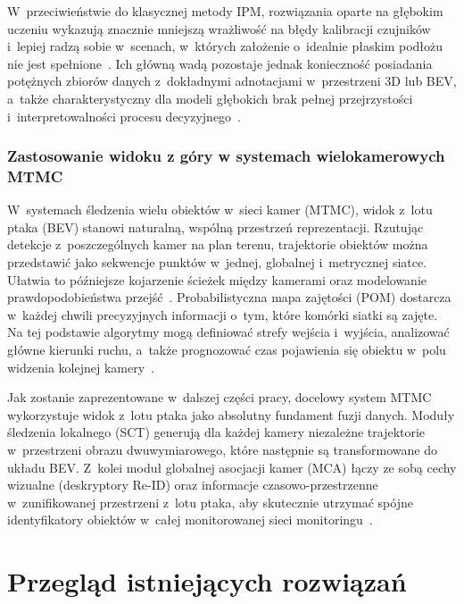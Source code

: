 W~przeciwieństwie do klasycznej metody IPM, rozwiązania oparte na głębokim uczeniu wykazują
znacznie mniejszą wrażliwość na błędy kalibracji czujników i~lepiej radzą sobie w~scenach,
w~których założenie o~idealnie płaskim podłożu nie jest spełnione~\cite{li2023}. Ich główną wadą
pozostaje jednak konieczność posiadania potężnych zbiorów danych z~dokładnymi adnotacjami
w~przestrzeni 3D lub BEV, a~także charakterystyczny dla modeli głębokich brak pełnej przejrzystości
i~interpretowalności procesu decyzyjnego~\cite{li2023, zhao2024}.

\subsection{Zastosowanie widoku z góry w systemach wielokamerowych MTMC}

W~systemach śledzenia wielu obiektów w~sieci kamer (MTMC), widok z~lotu ptaka (BEV) stanowi
naturalną, wspólną przestrzeń reprezentacji. Rzutując detekcje z~poszczególnych kamer na plan
terenu, trajektorie obiektów można przedstawić jako sekwencje punktów w~jednej, globalnej
i~metrycznej siatce. Ułatwia to późniejsze kojarzenie ścieżek między kamerami oraz modelowanie
prawdopodobieństwa przejść~\cite{fleuret2008}. Probabilistyczna mapa zajętości (POM) dostarcza
w~każdej chwili precyzyjnych informacji o~tym, które komórki siatki są zajęte. Na tej podstawie
algorytmy mogą definiować strefy wejścia i~wyjścia, analizować główne kierunki ruchu, a~także
prognozować czas pojawienia się obiektu w~polu widzenia kolejnej kamery~\cite{fleuret2008}.

Jak zostanie zaprezentowane w~dalszej części pracy, docelowy system MTMC wykorzystuje widok z~lotu
ptaka jako absolutny fundament fuzji danych. Moduły śledzenia lokalnego (SCT) generują dla każdej
kamery niezależne trajektorie w~przestrzeni obrazu dwuwymiarowego, które następnie są
transformowane do układu BEV. Z~kolei moduł globalnej asocjacji kamer (MCA) łączy ze sobą cechy
wizualne (deskryptory Re-ID) oraz informacje czasowo-przestrzenne w~zunifikowanej przestrzeni
z~lotu ptaka, aby skutecznie utrzymać spójne identyfikatory obiektów w~całej monitorowanej sieci
monitoringu~\cite{woo2024, riu2024}.

\chapter{Przegląd istniejących rozwiązań}\label{chap:przegląd_rozwiązań}

